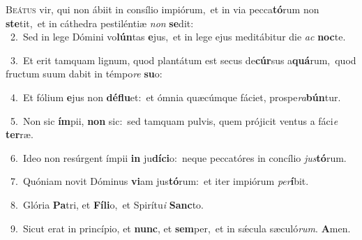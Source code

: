 \lettrine{\initial\textcolor{\initialcolor}{B}}{eátus} vir, qui non ábiit in consílio impiórum,~\dagger et in via pecca\-\textbf{tó}\-rum non \textbf{ste}\-tit,~\star et in cáthedra pestiléntiæ \textit{non} \textbf{se}\-dit:\\
{\numbfont\textcolor{\numbcolor}{~2.}}~Sed in lege Dómini vo\-\textbf{lún}\-tas \textbf{e}\-jus,~\star et in lege ejus meditábitur die \textit{ac} \textbf{noc}\-te.\par
{\numbfont\textcolor{\numbcolor}{~3.}}~Et erit tamquam lignum, quod plantátum est secus de\-\textbf{cúr}\-sus a\-\textbf{quá}\-rum,~\star quod fructum suum dabit in témpo\textit{re} \textbf{su}\-o:\par
{\numbfont\textcolor{\numbcolor}{~4.}}~Et fólium \textbf{e}\-jus non \textbf{dé}\-\textbf{flu}et:~\star et ómnia quæcúmque fáciet, prospe\-\textit{ra}\-\textbf{bún}tur.\par
{\numbfont\textcolor{\numbcolor}{~5.}}~Non sic \textbf{ím}\-pii, \textbf{non} sic:~\star sed tamquam pulvis, quem prójicit ventus a fáci\textit{e} \textbf{ter}\-ræ.\par
{\numbfont\textcolor{\numbcolor}{~6.}}~Ideo non resúrgent ímpii \textbf{in} ju\-\textbf{dí}\-\textbf{ci}o:~\star neque peccatóres in concílio \textit{jus}\-\textbf{tó}rum.\par
{\numbfont\textcolor{\numbcolor}{~7.}}~Quóniam novit Dóminus \textbf{vi}\-am jus\-\textbf{tó}\-rum:~\star et iter impiórum \textit{per}\-\textbf{í}bit.\par
{\numbfont\textcolor{\numbcolor}{~8.}}~Glória \textbf{Pa}\-tri, et \textbf{Fí}\-\textbf{li}o,~\star et Spirítu\textit{i} \textbf{Sanc}\-to.\par
{\numbfont\textcolor{\numbcolor}{~9.}}~Sicut erat in princípio, et \textbf{nunc}\-, et \textbf{sem}\-per,~\star et in sǽcula sæculó\-\textit{rum}\-. \textbf{A}\-men.\par
